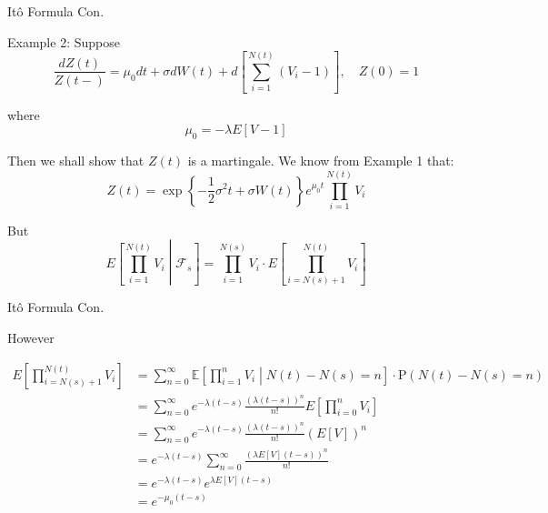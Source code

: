 \documentclass{beamer}
\begin{document}
\begin{frame}{Itô Formula Con.}

    {\footnotesize \footnotesize
    \par Example 2: Suppose  
    \[
    \frac{dZ(t)}{Z(t-)} = \mu_0 dt + \sigma dW(t) + d \left[ \sum_{i=1}^{N(t)} (V_i - 1) \right], \quad Z(0) = 1
    \]
    \par where  
    \[
    \mu_0 = -\lambda E[V - 1]
    \]
    \par Then we shall show that \(Z(t)\) is a martingale. We know from Example 1 that:
    \[
    Z(t) = \exp \left\{ -\frac{1}{2} \sigma^2 t + \sigma W(t) \right\} e^{\mu_0 t} \prod_{i=1}^{N(t)} V_i
    \]
    \par But  
    \[
    E \left[ \prod_{i=1}^{N(t)} V_i \middle| \mathcal{F}_s \right] 
    = \prod_{i=1}^{N(s)} V_i \cdot E \left[ \prod_{i=N(s)+1}^{N(t)} V_i \right]
    \]
    }
    
\end{frame}

\begin{frame}{Itô Formula Con.}

    {\footnotesize \footnotesize
    \par However

    \[
    \begin{aligned}
    E \left[ \prod_{i=N(s)+1}^{N(t)} V_i \right] 
    &=\sum_{n=0}^{\infty} \mathbb{E} \left[ \prod_{i=1}^{n} V_i \middle| N(t)-N(s) = n \right] \cdot \text{P}(N(t)-N(s) = n)\\
    &= \sum_{n=0}^{\infty} e^{-\lambda (t-s)} \frac{(\lambda (t-s))^n}{n!} E \left[ \prod_{i=0}^{n} V_i \right] \\
    &= \sum_{n=0}^{\infty} e^{-\lambda (t-s)} \frac{(\lambda (t-s))^n}{n!} (E [V])^n \\
    &= e^{-\lambda (t-s)} \sum_{n=0}^{\infty} \frac{(\lambda E [V] (t-s))^n}{n!} \\
    &= e^{-\lambda (t-s)} e^{\lambda E [V] (t-s)} \\
    &= e^{-\mu_0 (t-s)}
    \end{aligned}
    \]
    }
    
\end{frame}
\end{document}

